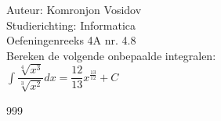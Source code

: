 \documentclass[a4paper]{article}
\newcommand{\dint}{\displaystyle\int}
\begin{document}
	
	\noindent \large Auteur: Komronjon Vosidov \\
	\noindent \large Studierichting: Informatica\\
	\noindent \large Oefeningenreeks 4A nr. 4.8\\
	
	
	\medskip
	\normalsize
	Bereken de volgende onbepaalde integralen:\\
	
$ \dint \dfrac{\sqrt[4]{x^3}}{\sqrt[3]{x^2}}  dx = \dfrac{12}{13} x^{\tfrac{13}{12}} + C $
	
	
	
	
	
	
	
	\begin{thebibliography}{999}
	\end{thebibliography}		
\end{document}
